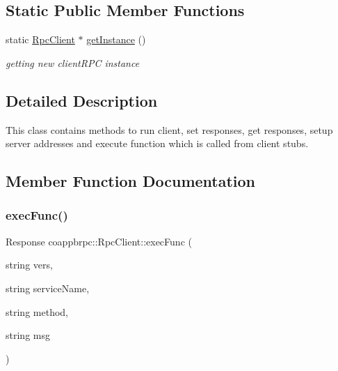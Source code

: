 \subsection*{Static Public Member Functions}
\begin{DoxyCompactItemize}
\item 
\mbox{\label{classcoappbrpc_1_1RpcClient_a36bb0e75fae00e4ea9e643d8c1b16f5c}} 
static \hyperlink{classcoappbrpc_1_1RpcClient}{Rpc\+Client} $\ast$ \hyperlink{classcoappbrpc_1_1RpcClient_a36bb0e75fae00e4ea9e643d8c1b16f5c}{get\+Instance} ()
\begin{DoxyCompactList}\small\item\em getting new client\+R\+PC instance \end{DoxyCompactList}\end{DoxyCompactItemize}


\subsection{Detailed Description}
This class contains methods to run client, set responses, get responses, setup server addresses and execute function which is called from client stubs. 

\subsection{Member Function Documentation}
\mbox{\label{classcoappbrpc_1_1RpcClient_afe2dc0caa49442db4898379d040c8b64}} 
\subsubsection{\texorpdfstring{exec\+Func()}{execFunc()}}
{\footnotesize\ttfamily Response coappbrpc\+::\+Rpc\+Client\+::exec\+Func (\begin{DoxyParamCaption}\item[{string}]{vers,  }\item[{string}]{service\+Name,  }\item[{string}]{method,  }\item[{string}]{msg }\end{DoxyParamCaption})}



